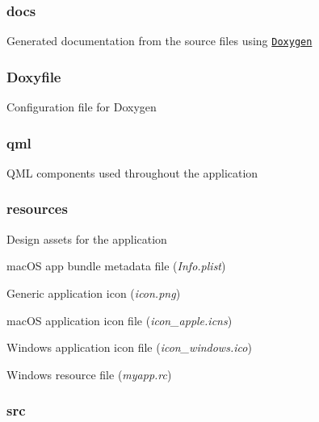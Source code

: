 \subsubsection*{docs}


\begin{DoxyItemize}
\item Generated documentation from the source files using \href{http://www.doxygen.nl}{\tt Doxygen}
\end{DoxyItemize}

\subsubsection*{Doxyfile}


\begin{DoxyItemize}
\item Configuration file for Doxygen
\end{DoxyItemize}

\subsubsection*{qml}


\begin{DoxyItemize}
\item Q\+ML components used throughout the application
\end{DoxyItemize}

\subsubsection*{resources}


\begin{DoxyItemize}
\item Design assets for the application
\item mac\+OS app bundle metadata file ({\itshape Info.\+plist})
\item Generic application icon ({\itshape icon.\+png})
\item mac\+OS application icon file ({\itshape icon\+\_\+apple.\+icns})
\item Windows application icon file ({\itshape icon\+\_\+windows.\+ico})
\item Windows resource file ({\itshape myapp.\+rc})
\end{DoxyItemize}

\subsubsection*{src}


